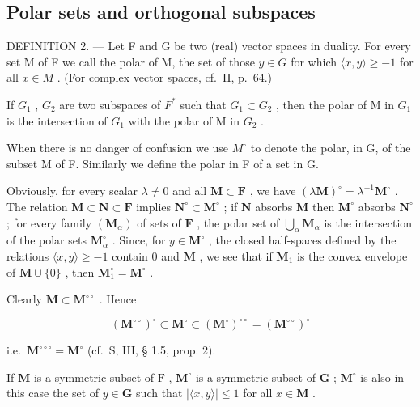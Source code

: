 \subsection{Polar sets and orthogonal subspaces}

DEFINITION 2. --- Let F and G be two (real) vector spaces in duality. For every set M of F we call the polar of M, the set of those \(y \in G\) for which \(\langle x, y \rangle \geqslant -1\) for all \(x \in M\) . (For complex vector spaces, cf.~II, p.~64.)

If \(G_{1}\) , \(G_{2}\) are two subspaces of \(F^{*}\) such that \(G_{1} \subset G_{2}\) , then the polar of M in \(G_{1}\) is the intersection of \(G_{1}\) with the polar of M in \(G_{2}\) .

When there is no danger of confusion we use \(M^{\circ}\) to denote the polar, in G, of the subset M of F. Similarly we define the polar in F of a set in G.

Obviously, for every scalar \(\lambda \neq 0\) and all \(\mathbf{M} \subset \mathbf{F}\) , we have \((\lambda \mathbf{M})^{\circ} = \lambda^{-1} \mathbf{M}^{\circ}\) . The relation \(\mathbf{M} \subset \mathbf{N} \subset \mathbf{F}\) implies \(\mathbf{N}^{\circ} \subset \mathbf{M}^{\circ}\) ; if \(\mathbf{N}\) absorbs \(\mathbf{M}\) then \(\mathbf{M}^{\circ}\) absorbs \(\mathbf{N}^{\circ}\) ; for every family \((\mathbf{M}_{\alpha})\) of sets of \(\mathbf{F}\) , the polar set of \(\bigcup_{\alpha} \mathbf{M}_{\alpha}\) is the intersection of the polar sets \(\mathbf{M}_{\alpha}^{\circ}\) . Since, for \(y \in \mathbf{M}^{\circ}\) , the closed half-spaces defined by the relations \(\langle x, y \rangle \geqslant -1\) contain 0 and \(\mathbf{M}\) , we see that if \(\mathbf{M}_{1}\) is the convex envelope of \(\mathbf{M} \cup \{0\}\) , then \(\mathbf{M}_{1}^{\circ} = \mathbf{M}^{\circ}\) .

Clearly \(\mathbf{M} \subset \mathbf{M}^{\circ \circ}\) . Hence

\[
(\mathbf {M} ^ {\circ \circ}) ^ {\circ} \subset \mathbf {M} ^ {\circ} \subset (\mathbf {M} ^ {\circ}) ^ {\circ \circ} = (\mathbf {M} ^ {\circ \circ}) ^ {\circ}
\]

i.e.~\(\mathbf{M}^{\circ \circ \circ} = \mathbf{M}^{\circ}\) (cf.~S, III, § 1.5, prop. 2).

If \(\mathbf{M}\) is a symmetric subset of \(\mathrm{F}\) , \(\mathbf{M}^{\circ}\) is a symmetric subset of \(\mathbf{G}\) ; \(\mathbf{M}^{\circ}\) is also in this case the set of \(y \in \mathbf{G}\) such that \(|\langle x, y \rangle| \leqslant 1\) for all \(x \in \mathbf{M}\) .

